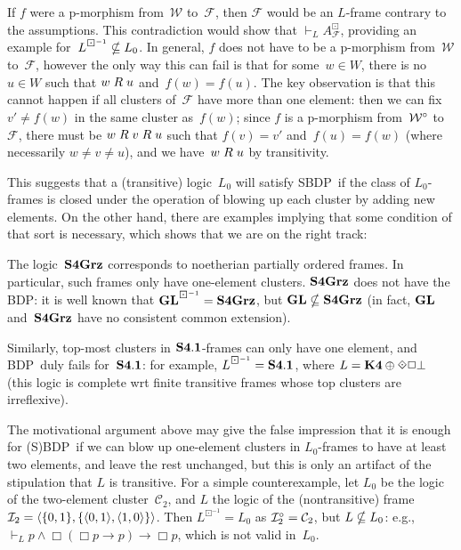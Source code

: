 \documentclass[leqno,draft,11pt]{article}
\def\bdi#1{#1^{\boxdot^{-1}}}
\def\wbc{BDP}
\def\sbc{SBDP}
\let\frm\mathcal
\begin{document}
If $f$ were a p-morphism from~$\frm W$ to~$\frm F$, then $\frm F$
would be an $L$-frame contrary to the assumptions. This contradiction
would show that $\vdash_LA_\frm F^\boxdot$, providing an
example for~$\bdi L\nsset L_0$. In general, $f$ does not have to be a p-morphism
from~$\frm W$ to~$\frm F$, however the only
way this can fail is that for some~$w\in W$, there is no~$u\in W$ such
that $w\mathrel Ru$ and~$f(w)=f(u)$. The key observation is that this
cannot happen if all clusters of~$\frm F$ have more than one element:
then we can fix $v'\ne f(w)$ in the same cluster as~$f(w)$; since $f$
is a p-morphism from~$\frm W^\R$ to~$\frm F$, there must be $w\mathrel
Rv\mathrel Ru$ such that $f(v)=v'$ and~$f(u)=f(w)$ (where necessarily $w\ne
v\ne u$), and we have~$w\mathrel Ru$ by transitivity.

This suggests that a (transitive) logic~$L_0$ will satisfy \sbc\ if the
class of $L_0$-frames is closed under the operation of blowing up each
cluster by adding new elements. On the other hand, there are examples
implying that some condition of that sort is necessary, which shows
that we are on the right track:
\begin{Exm}\th\label{exm:bdpfail}
The logic~$\mathbf{S4Grz}$ corresponds to noetherian partially ordered
frames. In particular, such frames only have one-element clusters.
$\mathbf{S4Grz}$ does not have the \wbc: it is well known that
$\bdi{\lgc{GL}}=\lgc{S4Grz}$, but $\mathbf{GL}\nsubseteq\mathbf{S4Grz}$ (in
fact, $\mathbf{GL}$ and~$\mathbf{S4Grz}$ have no consistent common
extension).

Similarly, top-most clusters in $\mathbf{S4.1}$-frames can only have one
element, and \wbc\ duly fails for~$\mathbf{S4.1}$: for example,
$\bdi L=\lgc{S4.1}$, where $L=\lgc{K4}\oplus\diadot\Box\bot$
(this logic is complete wrt finite 
transitive frames whose top clusters are irreflexive).

The motivational argument above may give the false impression that
it is enough for (S)\wbc\ if we can blow up one-element clusters in
$L_0$-frames to have at least two elements, and leave the rest unchanged,
but this is only an artifact of the stipulation that $L$ is
transitive. For a simple counterexample, let $L_0$ be the logic
of the two-element cluster~$\frm C_2$, and $L$ the logic of the
(nontransitive) frame $\frm I_2=\p{\{0,1\},\{\p{0,1},\p{1,0}\}}$. Then
$\bdi L=L_0$ as $\frm I_2^\R=\frm C_2$, but $L\nsubseteq L_0$: e.g.,
$\vdash_Lp\land\Box(\Box p\to p)\to\Box p$, which is not valid
in~$L_0$.
\end{Exm}
\end{document}

